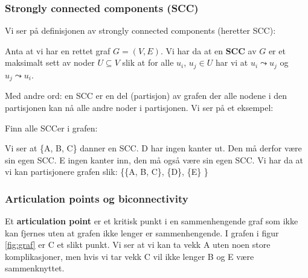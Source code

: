 \subsubsection{Strongly connected components (SCC)}
Vi ser på definisjonen av strongly connected components (heretter SCC): 
\begin{definition}
Anta at vi har en rettet graf $ G = (V, E) $. Vi har da at en \textbf{SCC} av $ G $ er et maksimalt sett av noder $ U \subseteq V $ slik at for alle $ u_i $, $ u_j \in U $ har vi at $ u_i \leadsto u_j $ og $ u_j \leadsto u_i $.
\end{definition}

Med andre ord: en SCC er en del (partisjon) av grafen der alle nodene i den partisjonen kan nå alle andre noder i partisjonen. Vi ser på et eksempel: 

\begin{example} Finn alle SCCer i grafen:
\begin{figure}[H]
\centering
{}
\end{figure}
Vi ser at \{A, B, C\} danner en SCC. D har ingen kanter ut. Den må derfor være sin egen SCC. E ingen kanter inn, den må også være sin egen SCC. Vi har da at vi kan partisjonere grafen slik: \{\{A, B, C\}, \{D\}, \{E\} \}
\end{example}

\subsubsection{Articulation points og biconnectivity}
Et \textbf{articulation point} er et kritisk punkt i en sammenhengende graf som ikke kan fjernes uten at grafen ikke lenger er sammenhengende. I grafen i figur \ref{fig:graf} er C et slikt punkt. Vi ser at vi kan ta vekk A uten noen store komplikasjoner, men hvis vi tar vekk C vil ikke lenger B og E være sammenknyttet.


